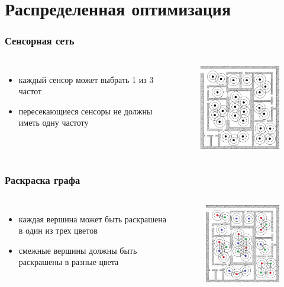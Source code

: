 \documentclass{beamer}
\begin{document}
\section{Распределенная оптимизация}

\begin{frame}
\frametitle{Сенсорная сеть}
  \begin{columns}[c]
    \begin{itemize}
      \item каждый сенсор может выбрать 1 из 3 частот
      \item пересекающиеся сенсоры не должны иметь одну частоту
    \end{itemize}

    \begin{figure}
       \includegraphics[width=5cm]{images/sensors.jpg}
    \end{figure}
  \end{columns}
\end{frame}

\begin{frame}
\frametitle{Раскраска графа}
  \begin{columns}[c]
    \begin{itemize}
      \item каждая вершина может быть раскрашена в один из трех цветов
      \item смежные вершины должны быть раскрашены в разные цвета
    \end{itemize}

    \begin{figure}
       \includegraphics[width=5cm]{images/graph-coloring.jpg}
    \end{figure}
  \end{columns}
\end{frame}
\end{document}
